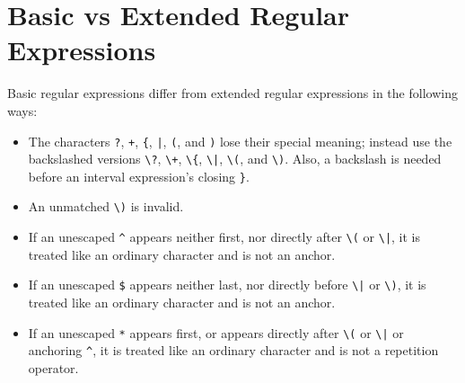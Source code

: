 \section{Basic vs Extended Regular Expressions}

Basic regular expressions differ from extended regular expressions in the following ways:
\begin{itemize}
    \item The characters \verb+?+, \verb-+-, \verb+{+, \verb+|+, \verb+(+, and
            \verb+)+ lose their special meaning; instead use the backslashed
            versions \verb+\?+, \verb-\+-, \verb+\{+, \verb+\|+, \verb+\(+, and
            \verb+\)+. Also, a backslash is needed before an interval
        expression’s closing \verb+}+.
    \item An unmatched \verb+\)+ is invalid.
    \item If an unescaped \verb+^+ appears neither first, nor directly after
        \verb+\(+ or \verb+\|+, it is treated like an ordinary character and is
            not an anchor.
    \item If an unescaped \verb+$+ appears neither last, nor directly before
    \verb+\|+ or \verb+\)+, it is treated like an ordinary character and is not
    an anchor.
    \item If an unescaped \verb+*+ appears first, or appears directly after
        \verb+\(+ or \verb+\|+ or anchoring \verb+^+, it is treated like an
            ordinary character and is not a repetition operator. 
\end{itemize}

